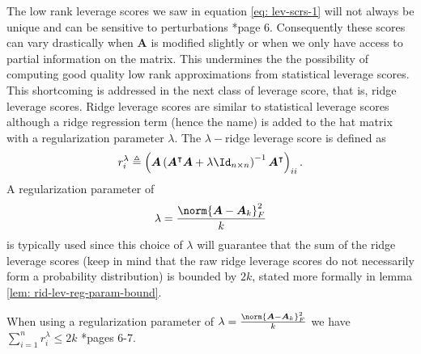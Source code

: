 The low rank leverage scores we saw in equation \ref{eq: lev-scrs-1} will not always be unique and can be sensitive to perturbations \cite{DBLP:journals/corr/CohenMM15}*{page 6}. Consequently these scores can vary drastically when $\bm{A}$ is modified slightly or when we only have access to partial information on the matrix. This undermines the the possibility of computing good quality low rank approximations from statistical leverage scores. This shortcoming is addressed in the next class of leverage score, that is, ridge leverage scores. Ridge leverage scores are similar to statistical leverage scores although a ridge regression term (hence the name) is added to the hat matrix with a regularization parameter $\lambda$. The $\lambda-$ridge leverage score is defined as
\begin{equation*}
    r_{i}^{\lambda} \triangleq \left( \bm{A} \left( \bm{A}^{\intercal} \bm{A} + \lambda \Id_{n \times n} \right)^{-1} \bm{A}^{\intercal} \right)_{ii}.
\end{equation*}
A regularization parameter of
\begin{equation*} \label{eq: rid-lev-reg-param}
    \lambda = \frac{\norm{\bm{A} - \bm{A}_k}_F^{2}}{k}
\end{equation*}
is typically used since this choice of $\lambda$ will guarantee that the sum of the ridge leverage scores (keep in mind that the raw ridge leverage scores do not necessarily form a probability distribution) is bounded by $2k$, stated more formally in lemma \ref{lem: rid-lev-reg-param-bound}.
\begin{lem} \label{lem: rid-lev-reg-param-bound}
    When using a regularization parameter of $\lambda = \frac{\norm{\bm{A} - \bm{A}_k}_F^{2}}{k}$ we have $\sum_{i=1}^{n} r_{i}^{\lambda} \leq 2k$ \cite{DBLP:journals/corr/CohenMM15}*{pages 6-7}.
\end{lem}
